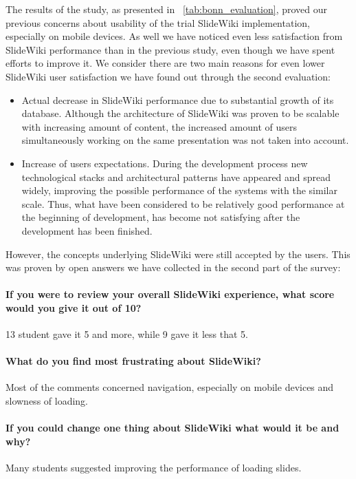 \documentclass[ngerman,UKenglish,table]{scrbook}
\begin{document}
The results of the study, as presented in ~\autoref{tab:bonn_evaluation}, proved our previous concerns about usability of the trial SlideWiki implementation, especially on mobile devices.
As well we have noticed even less satisfaction from SlideWiki performance than in the previous study, even though we have spent efforts to improve it.
We consider there are two main reasons for even lower SlideWiki user satisfaction we have found out through the second evaluation:
\begin{itemize}
\item Actual decrease in SlideWiki performance due to substantial growth of its database. Although the architecture of SlideWiki was proven to be scalable with increasing amount of content, the increased amount of users simultaneously working on the same presentation was not taken into account.
\item Increase of users expectations. During the development process new technological stacks and architectural patterns have appeared and spread widely, improving the possible performance of the systems with the similar scale. Thus, what have been considered to be relatively good performance at the beginning of development, has become not satisfying after the development has been finished.
\end{itemize}

However, the concepts underlying SlideWiki were still accepted by the users.
This was proven by open answers we have collected in the second part of the survey:
\paragraph{If you were to review your overall SlideWiki experience, what score would you give it out of 10?} 13 student gave it 5 and more, while 9 gave it less that 5.

\paragraph{What do you find most frustrating about SlideWiki?} Most of the comments concerned navigation, especially on mobile devices and slowness of loading.

\paragraph{If you could change one thing about SlideWiki what would it be and why?} Many students suggested improving the performance of loading slides.
\end{document}
